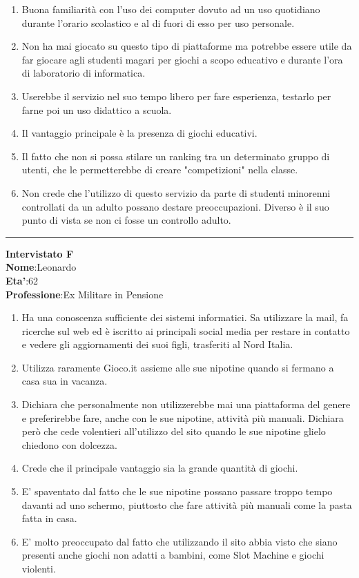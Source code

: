 \documentclass[../Report.tex]{subfiles}
\begin{document}
    \begin{enumerate}
        \item Buona familiarità con l’uso dei computer dovuto ad un uso quotidiano durante l’orario scolastico e al di fuori di esso per uso personale.
        \item Non ha mai giocato su questo tipo di piattaforme ma potrebbe essere utile da far giocare agli studenti magari per giochi a scopo educativo e durante l’ora di laboratorio di informatica.
        \item Userebbe il servizio nel suo tempo libero per fare esperienza, testarlo per farne poi un uso didattico a scuola.
        \item Il vantaggio principale è la presenza di giochi educativi.
        \item Il fatto che non si possa stilare un ranking tra un determinato gruppo di utenti, che le permetterebbe di creare "competizioni" nella classe.
        \item Non crede che l’utilizzo di questo servizio da parte di studenti minorenni controllati da un adulto possano destare preoccupazioni. Diverso è il suo punto di vista se non ci fosse un controllo adulto. 
    \end{enumerate}
    
    \hrule
    \textbf{Intervistato F}\\
    \textbf{Nome}:Leonardo \\
    \textbf{Eta'}:62\\
    \textbf{Professione}:Ex Militare in Pensione

    \begin{enumerate}
        \item Ha una conoscenza sufficiente dei sistemi informatici. Sa utilizzare la mail, fa ricerche sul web ed è iscritto ai principali social media per restare in contatto e vedere gli aggiornamenti dei suoi figli, trasferiti al Nord Italia. 
        \item Utilizza raramente Gioco.it assieme alle sue nipotine quando si fermano a casa sua in vacanza. 
        \item Dichiara che personalmente non utilizzerebbe mai una piattaforma del genere e preferirebbe fare, anche con le sue nipotine, attività più manuali. Dichiara però che cede volentieri all'utilizzo del sito quando le sue nipotine glielo chiedono con dolcezza. 
        \item Crede che il principale vantaggio sia la grande quantità di giochi. 
        \item E' spaventato dal fatto che le sue nipotine possano passare troppo tempo davanti ad uno schermo, piuttosto che fare attività più manuali come la pasta fatta in casa. 
        \item E' molto preoccupato dal fatto che utilizzando il sito abbia visto che siano presenti anche giochi non adatti a bambini, come Slot Machine e giochi violenti.    
    \end{enumerate}
    
\end{document}
